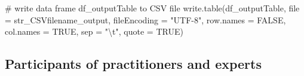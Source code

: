 \documentclass[
]{article}
\newenvironment{Shaded}{\begin{snugshade}}{\end{snugshade}}
\newcommand{\AttributeTok}[1]{\textcolor[rgb]{0.00,0.34,0.68}{#1}}
\newcommand{\CommentTok}[1]{\textcolor[rgb]{0.54,0.53,0.53}{#1}}
\newcommand{\ConstantTok}[1]{\textcolor[rgb]{0.67,0.33,0.00}{#1}}
\newcommand{\FunctionTok}[1]{\textcolor[rgb]{0.39,0.29,0.61}{#1}}
\newcommand{\NormalTok}[1]{\textcolor[rgb]{0.12,0.11,0.11}{#1}}
\newcommand{\SpecialCharTok}[1]{\textcolor[rgb]{0.24,0.68,0.91}{#1}}
\newcommand{\StringTok}[1]{\textcolor[rgb]{0.75,0.01,0.01}{#1}}
\begin{document}
\begin{Shaded}
\begin{Highlighting}[]
\CommentTok{\# write data frame \textquotesingle{}df\_outputTable\textquotesingle{} to CSV file}
\FunctionTok{write.table}\NormalTok{(df\_outputTable, }\AttributeTok{file =}\NormalTok{ str\_CSVfilename\_output,}
            \AttributeTok{fileEncoding =} \StringTok{"UTF{-}8"}\NormalTok{, }\AttributeTok{row.names =} \ConstantTok{FALSE}\NormalTok{,}
            \AttributeTok{col.names =} \ConstantTok{TRUE}\NormalTok{, }\AttributeTok{sep =} \StringTok{"}\SpecialCharTok{\textbackslash{}t}\StringTok{"}\NormalTok{, }\AttributeTok{quote =} \ConstantTok{TRUE}\NormalTok{)}
\end{Highlighting}
\end{Shaded}

\hypertarget{participants-of-practitioners-and-experts}{%
\subsection{Participants of practitioners and
experts}\label{participants-of-practitioners-and-experts}}
\end{document}
